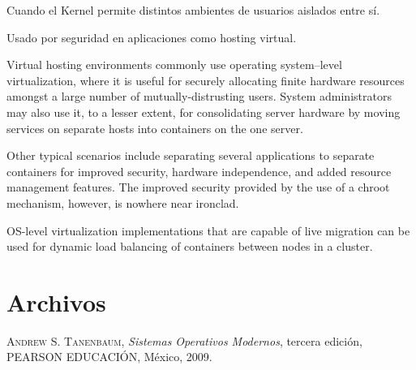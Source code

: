 \documentclass[a4paper, twoside]{article}
\begin{document}
Cuando el Kernel permite distintos ambientes de usuarios aislados entre sí.

Usado por seguridad en aplicaciones como hosting virtual.

Virtual hosting environments commonly use operating system–level virtualization, where it is useful for securely allocating finite hardware resources amongst a large number of mutually-distrusting users. System administrators may also use it, to a lesser extent, for consolidating server hardware by moving services on separate hosts into containers on the one server.

Other typical scenarios include separating several applications to separate containers for improved security, hardware independence, and added resource management features. The improved security provided by the use of a chroot mechanism, however, is nowhere near ironclad.

OS-level virtualization implementations that are capable of live migration can be used for dynamic load balancing of containers between nodes in a cluster.

\newpage
\section{Archivos}


\newpage
\newcommand{\bibliographyname}{Bibliografía} %
\addcontentsline{toc}{section}{\bibliographyname} %
\renewcommand\refname{\bibliographyname} %
\begin{thebibliography}{X}
	 \textsc{Andrew S. Tanenbaum}, \textit{Sistemas Operativos Modernos}, tercera edición, PEARSON EDUCACIÓN, México, 2009.
\end{thebibliography}


\makehistorial
\end{document}

